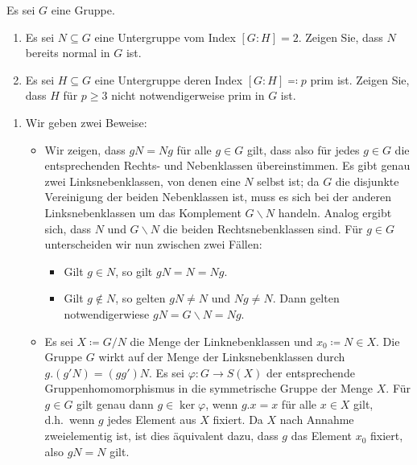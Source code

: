 \begin{question}[subtitle = Untergruppen von Index $2$]
  Es sei $G$ eine Gruppe.
  \begin{enumerate}
    \item
      Es sei $N \subseteq G$ eine Untergruppe vom Index $[G : H] = 2$.
      Zeigen Sie, dass $N$ bereits normal in $G$ ist.
    \item
      Es sei $H \subseteq G$ eine Untergruppe deren Index $[G : H] \eqqcolon p$ prim ist.
      Zeigen Sie, dass $H$ für $p \geq 3$ nicht notwendigerweise prim in $G$ ist.
  \end{enumerate}
\end{question}


\begin{solution}
  \begin{enumerate}
    \item
      Wir geben zwei Beweise:
      \begin{itemize}
        \item
          Wir zeigen, dass $gN = Ng$ für alle $g \in G$ gilt, dass also für jedes $g \in G$ die entsprechenden Rechts- und Nebenklassen übereinstimmen.
          Es gibt genau zwei Linksnebenklassen, von denen eine $N$ selbst ist;
          da $G$ die disjunkte Vereinigung der beiden Nebenklassen ist, muss es sich bei der anderen Linksnebenklassen um das Komplement $G \smallsetminus N$ handeln.
          Analog ergibt sich, dass $N$ und $G \smallsetminus N$ die beiden Rechtsnebenklassen sind.
          Für $g \in G$ unterscheiden wir nun zwischen zwei Fällen:
          \begin{itemize}
            \item
              Gilt $g \in N$, so gilt $gN = N = Ng$.
            \item
              Gilt $g \notin N$, so gelten $gN \neq N$ und $Ng \neq N$.
              Dann gelten notwendigerwiese $gN = G \smallsetminus N = Ng$.
          \end{itemize}
        \item
          Es sei $X \coloneqq G/N$ die Menge der Linknebenklassen und $x_0 \coloneqq N \in X$.
          Die Gruppe $G$ wirkt auf der Menge der Linksnebenklassen  durch $g.(g'N) = (gg')N$.
          Es sei $\varphi \colon G \to S(X)$ der entsprechende Gruppenhomomorphismus in die symmetrische Gruppe der Menge $X$.
          Für $g \in G$ gilt genau dann $g \in \ker \varphi$, wenn $g.x = x$ für alle $x \in X$ gilt, d.h.\ wenn $g$ jedes Element aus $X$ fixiert.
          Da $X$ nach Annahme zweielementig ist, ist dies äquivalent dazu, dass $g$ das Element $x_0$ fixiert, also $gN = N$ gilt.

\end{itemize}
\end{enumerate}
\end{solution}
